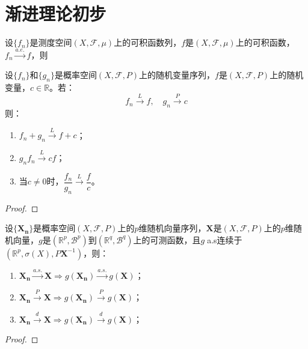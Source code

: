 \chapter{渐进理论初步}

\begin{theorem}
	设$\{f_n\}$是测度空间$(X,\mathscr{F},\mu)$上的可积函数列，$f$是$(X,\mathscr{F},\mu)$上的可积函数，$f_n\overset{a.e.}{\longrightarrow}f$，则
\end{theorem}
\begin{theorem}\label{theo:Slutsky}
	设$\{f_n\}$和$\{g_n\}$是概率空间$(X,\mathscr{F},P)$上的随机变量序列，$f$是$(X,\mathscr{F},P)$上的随机变量，$c\in\mathbb{R}$。若：
	\begin{equation*}
		f_n\overset{L}{\longrightarrow}f,\quad g_n\overset{P}{\longrightarrow}c
	\end{equation*}
	则：
	\begin{enumerate}
		\item $f_n+g_n\overset{L}{\longrightarrow}f+c$；
		\item $g_nf_n\overset{L}{\longrightarrow}cf$；
		\item 当$c\ne0$时，$\dfrac{f_n}{g_n}\overset{L}{\longrightarrow}\dfrac{f}{c}$。
	\end{enumerate}
\end{theorem}
\begin{proof}

\end{proof}
\begin{theorem}\label{theo:ContinuousMappingTheorem}
	设$\{\mathbf{X_n}\}$是概率空间$(X,\mathscr{F},P)$上的$p$维随机向量序列，$\mathbf{X}$是$(X,\mathscr{F},P)$上的$p$维随机向量，$g$是$(\mathbb{R}^{p},\mathcal{B}^p)$到$(\mathbb{R}^{q},\mathcal{B}^q)$上的可测函数，且$g\;$a.s连续于$(\mathbb{R}^{p},\sigma(X),P\mathbf{X}^{-1})$，则：
	\begin{enumerate}
		\item $\mathbf{X_n}\overset{a.s.}{\longrightarrow}\mathbf{X}\Rightarrow g(\mathbf{X_n})\overset{a.s.}{\longrightarrow}g(\mathbf{X})$；
		\item $\mathbf{X_n}\overset{P}{\longrightarrow}\mathbf{X}\Rightarrow g(\mathbf{X_n})\overset{P}{\longrightarrow}g(\mathbf{X})$；
		\item $\mathbf{X_n}\overset{d}{\longrightarrow}\mathbf{X}\Rightarrow g(\mathbf{X_n})\overset{d}{\longrightarrow}g(\mathbf{X})$；
	\end{enumerate}
\end{theorem}
\begin{proof}
	
\end{proof}



